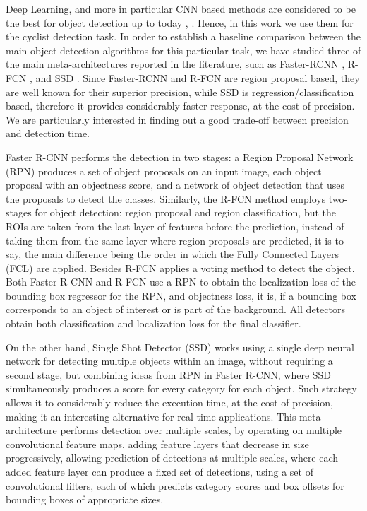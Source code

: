 \documentclass[journal]{IEEEtran}
\begin{document}
Deep Learning, and more in particular CNN based methods are considered to be the best for object detection up to today \cite{ObjectDetec2014}, \cite{zhao2019object}. Hence, in this work we use them for the cyclist detection task. In order to establish a baseline comparison between the main object detection algorithms for this particular task, we have studied three of the main meta-architectures reported in the literature, such as Faster-RCNN \cite{fasterObject2015}, R-FCN \cite{dai2016r}, and SSD \cite{liu2016ssd}. Since Faster-RCNN and R-FCN are region proposal based, they are well known for their superior precision, while SSD is regression/classification based, therefore it provides considerably faster response, at the cost of precision. We are particularly interested in finding out a good trade-off between precision and detection time. 

Faster R-CNN \cite{fasterObject2015} performs the detection in two stages: a Region Proposal Network (RPN) produces a set of object proposals on an input image, each object proposal with an objectness score, and a network of object detection that uses the proposals to detect the classes. Similarly, the R-FCN method employs two-stages for object detection: region proposal and region classification, but the ROIs are taken from the last layer of features before the prediction, instead of taking them from the same layer where region proposals are predicted, it is to say, the main difference being the order in which the Fully Connected Layers (FCL) are applied. Besides R-FCN applies a voting method to detect the object. Both Faster R-CNN and R-FCN use a RPN to obtain the localization loss of the bounding box regressor for the RPN, and objectness loss, it is, if a bounding box corresponds to an object of interest or is part of the background. All detectors obtain both classification and localization loss for the final classifier.

On the other hand, Single Shot Detector (SSD) \cite{liu2016ssd} works using a single deep neural network for detecting multiple objects within an image, without requiring a second stage, but combining ideas from RPN in Faster R-CNN, where SSD simultaneously produces a score for every category for each object. Such strategy allows it to considerably reduce the execution time, at the cost of precision, making it an interesting alternative for real-time applications. This meta-architecture performs detection over multiple scales, by operating on multiple convolutional feature maps, adding feature layers that decrease in size progressively, allowing prediction of detections at multiple scales, where each added feature layer can produce a fixed set of detections, using a set of convolutional filters, each of which predicts category scores and box offsets for bounding boxes of appropriate sizes. 
\end{document}
